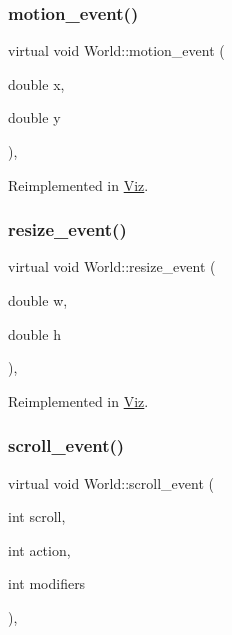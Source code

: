 \subsubsection{\texorpdfstring{motion\+\_\+event()}{motion\_event()}}
{\footnotesize\ttfamily virtual void World\+::motion\+\_\+event (\begin{DoxyParamCaption}\item[{double}]{x,  }\item[{double}]{y }\end{DoxyParamCaption})\hspace{0.3cm}{\ttfamily [protected]}, {\ttfamily [virtual]}}



Reimplemented in \mbox{\hyperlink{classViz_a4ddb97f01a80d99a103b51685aaf67c8}{Viz}}.

\mbox{\label{classWorld_aefc26f5ed9efe0753c3120009f608b89}} 
\subsubsection{\texorpdfstring{resize\+\_\+event()}{resize\_event()}}
{\footnotesize\ttfamily virtual void World\+::resize\+\_\+event (\begin{DoxyParamCaption}\item[{double}]{w,  }\item[{double}]{h }\end{DoxyParamCaption})\hspace{0.3cm}{\ttfamily [protected]}, {\ttfamily [virtual]}}



Reimplemented in \mbox{\hyperlink{classViz_a222dae75063cafe9ea0f5d50c03e3d1b}{Viz}}.

\mbox{\label{classWorld_af3d69f01929d97f989d1887f269f9c56}} 
\subsubsection{\texorpdfstring{scroll\+\_\+event()}{scroll\_event()}}
{\footnotesize\ttfamily virtual void World\+::scroll\+\_\+event (\begin{DoxyParamCaption}\item[{int}]{scroll,  }\item[{int}]{action,  }\item[{int}]{modifiers }\end{DoxyParamCaption})\hspace{0.3cm}{\ttfamily [protected]}, {\ttfamily [virtual]}}


